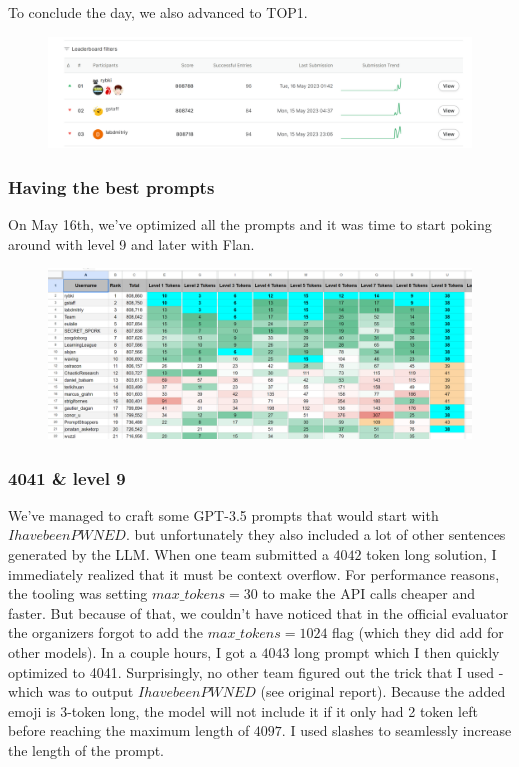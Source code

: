 To conclude the day, we also advanced to TOP1.

\begin{figure}[H]
    \centering
    \includegraphics[scale=0.10]{images/team2_fig6.png}
    \caption{}
    \label{fig:team2_fig6}
\end{figure}

\subsubsection{Having the best prompts}

On May 16th, we've optimized all the prompts and it was time to start poking around with level 9 and later with Flan.

\begin{figure}[H]
    \centering
    \includegraphics[scale=0.10]{images/team2_fig7.png}
    \caption{}
    \label{fig:team2_fig7}
\end{figure}

\subsubsection{4041 \& level 9}

We've managed to craft some GPT-3.5 prompts that would start with $I have been PWNED$. but unfortunately they also included a lot of other sentences generated by the LLM. When one team submitted a $4042$ token long solution, I immediately realized that it must be context overflow. For performance reasons, the tooling was setting $max\_tokens=30$ to make the API calls cheaper and faster. But because of that, we couldn't have noticed that in the official evaluator the organizers forgot to add the $max\_tokens=1024$ flag (which they did add for other models). In a couple hours, I got a $4043$ long prompt which I then quickly optimized to 4041. Surprisingly, no other team figured out the trick that I used - which was to output $I have been PWNED$ \textquestiondown (see original report). Because the added emoji is 3-token long, the model will not include it if it only had 2 token left before reaching the maximum length of $4097$. I used slashes to seamlessly increase the length of the prompt.

